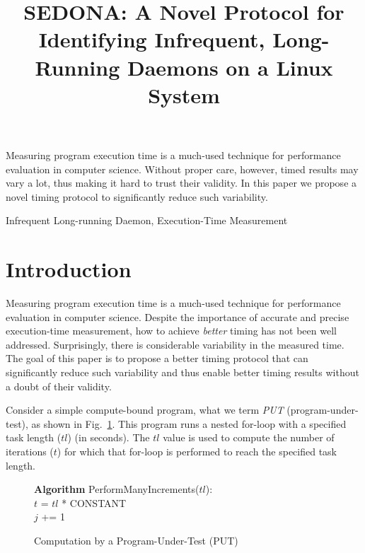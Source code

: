 \documentclass[letter]{ieice}
\title{SEDONA: A Novel Protocol for Identifying Infrequent, Long-Running Daemons on a Linux System}
\begin{document}
\maketitle

\begin{summary}
{\color{blue}Measuring program execution time is 
a \hbox{much-used} technique for performance evaluation in computer science. 
Without proper care, however, timed results may vary a lot, 
thus making it hard to trust their validity. 
In this paper we propose a novel timing protocol to significantly 
reduce such variability.}

\end{summary}
\begin{keywords}
Infrequent Long-running Daemon, Execution-Time Measurement
\end{keywords}

\section{Introduction}
\label{sec:intro}

Measuring program execution time is a much-used
technique for performance evaluation in computer science. 
Despite the importance of accurate and precise execution-time measurement, 
how to achieve {\em better} timing has not been well addressed. 
Surprisingly, there is considerable variability in the measured time.
{\color{blue} The goal of this paper is to propose
a better timing protocol that can significantly reduce such variability 
and thus enable better timing results without a doubt of their validity.}

Consider a simple compute-bound program, what we term {\em PUT} (program-under-test), 
as shown in Fig.~\ref{alg:put}. 
This program runs a nested for-loop with a specified task length ($tl$) (in seconds). 
{\color{blue}The $tl$ value is used to compute 
the number of iterations ($t$) for which that for-loop is performed 
to reach the specified task length.}

\vspace{-.2in}
\begin{figure}[h]
\begin{center}
\begin{algorithmic}
{\bf Algorithm} PerformManyIncrements($tl$): \\
\STATE $t$ = $tl$ * {CONSTANT} \\
		\STATE $j$ += 1 \\
	\ENDFOR 
\ENDFOR 
\end{algorithmic}
\end{center}
\caption{Computation by a Program-Under-Test (PUT)\label{alg:put}}
\vspace{-.2in}
\end{figure}
\end{document}
